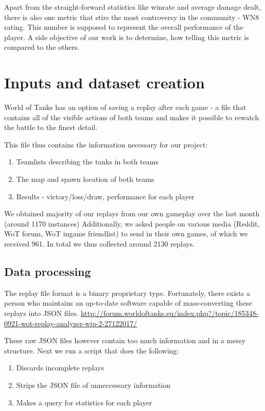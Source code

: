 \documentclass{report}
\begin{document}
Apart from the straight-forward statistics like winrate and average damage dealt, there is also one metric that stirs the most controversy in the community - WN8 rating. This number is supposed to represent the overall performance of the player. A side objective of our work is to determine, how telling this metric is compared to the others.

\section{Inputs and dataset creation}

World of Tanks has an option of saving a replay after each game - a file that contains all of the visible actions of both teams and makes it possible to rewatch the battle to the finest detail.

This file thus contains the information necessary for our project:
\begin{enumerate}
	\item{Teamlists describing the tanks in both teams}
	\item{The map and spawn location of both teams}
	\item{Results - victory/loss/draw, performance for each player}
\end{enumerate}

We obtained majority of our replays from our own gameplay over the last month (around 1170 instances) 
Additionally, we asked people on various media (Reddit, WoT forum, WoT ingame friendlist) to send in 
their own games, of which we received 961. In total we thus collected around 2130 replays.

\subsection{Data processing}

The replay file format is a binary proprietary type. Fortunately, there exists a person who maintains an up-to-date software capable of mass-converting these replays into JSON files. 
\url{http://forum.worldoftanks.eu/index.php?/topic/185348-0921-wot-replay-analyzer-wip-2-27122017/}


These raw JSON files however contain too much information and in a messy structure. Next we run a script that does the following:
\begin{enumerate}
	\item{Discards incomplete replays}
	\item{Strips the JSON file of unneccessary information}
	\item{Makes a query for statistics for each player}
\end{enumerate}
\end{document}
